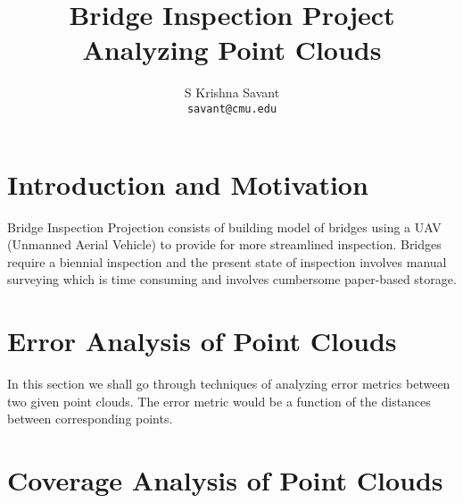 \documentclass[notitlepage]{article}
\title{Bridge Inspection Project\\[1cm]\textbf{Analyzing Point Clouds}\\[1cm]}
\author{S Krishna Savant\\
        \texttt{savant@cmu.edu}\\
        }
\begin{document}
\maketitle

\tableofcontents

\pagebreak

\section{Introduction and Motivation}
Bridge Inspection Projection consists of building model of bridges using a UAV (Unmanned Aerial Vehicle) to provide for more streamlined inspection. Bridges require a biennial inspection and the present state of inspection involves manual surveying which is time consuming and involves cumbersome paper-based storage.

\section{Error Analysis of Point Clouds}
    In this section we shall go through techniques of analyzing error metrics between two given point clouds. The error metric would be a function of the distances between corresponding points.

\section{Coverage Analysis of Point Clouds}
\end{document}
